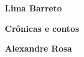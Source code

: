 \textbf{Lima Barreto} \lipsum[1]

\textbf{Crônicas e contos} \lipsum[2]

\textbf{Alexandre Rosa} \lipsum[3]







